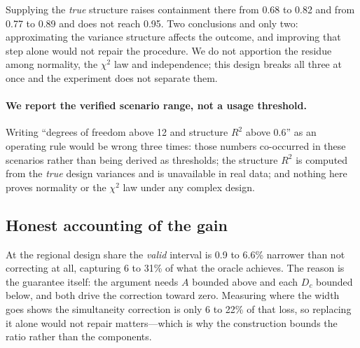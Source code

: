 Supplying the \emph{true} structure raises containment there from 0.68 to 0.82
and from 0.77 to 0.89 and does not reach 0.95. Two conclusions and only two:
approximating the variance structure affects the outcome, and improving that step
alone would not repair the procedure. We do not apportion the residue among
normality, the $\chi^2$ law and independence; this design breaks all three at
once and the experiment does not separate them.

\paragraph{We report the verified scenario range, not a usage threshold.} Writing
``degrees of freedom above 12 and structure $R^2$ above 0.6'' as an operating rule
would be wrong three times: those numbers co-occurred in these scenarios rather
than being derived as thresholds; the structure $R^2$ is computed from the
\emph{true} design variances and is unavailable in real data; and nothing here
proves normality or the $\chi^2$ law under any complex design.

\subsection{Honest accounting of the gain}

At the regional design share the \emph{valid} interval is 0.9 to 6.6\% narrower
than not correcting at all, capturing 6 to 31\% of what the oracle achieves. The
reason is the guarantee itself: the argument needs $A$ bounded above and each
$D_c$ bounded below, and both drive the correction toward zero. Measuring where
the width goes shows the simultaneity correction is only 6 to 22\% of that loss,
so replacing it alone would not repair matters---which is why the construction
bounds the ratio rather than the components.
